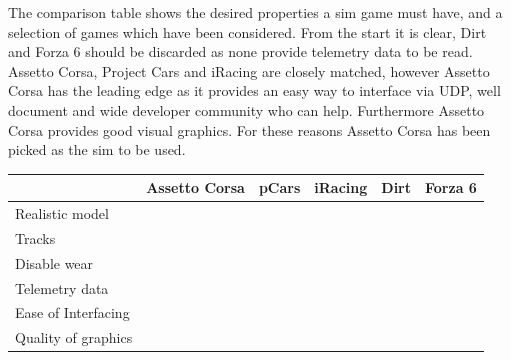The comparison table shows the desired properties a sim game must have, and a selection of games which have been considered. From the start it is clear, Dirt and Forza 6 should be discarded as none provide telemetry data to be read. Assetto Corsa, Project Cars and iRacing are closely matched, however Assetto Corsa has the leading edge as it provides an easy way to interface via UDP, well document and wide developer community who can help. Furthermore Assetto Corsa provides good visual graphics. For these reasons Assetto Corsa has been picked as the sim to be used.

\begin{center}
	\begin{tabular}{ | l | l | l | l | l | l |}
		\hline
			& Assetto Corsa\cite{assestoCorsa} & pCars \cite{ProjectCars} & iRacing \cite{iRacing} & Dirt \cite{dirtgame} & Forza 6 \cite{forza} \\ \hline
		Realistic model	& \checkmark &\checkmark & \checkmark & \checkmark & \checkmark \\ \hline
		Tracks	& \checkmark &\checkmark & \checkmark &  & \checkmark \\ \hline
		Disable wear & \checkmark & \checkmark & \checkmark & \checkmark & \checkmark \\ \hline
		Telemetry data	& \checkmark & \checkmark & \checkmark &  &  \\ \hline
		Ease of Interfacing	& \checkmark &  & \checkmark &  &  \\ \hline
		Quality of graphics & \checkmark & \checkmark &  & \checkmark & \checkmark \\ \hline
	\end{tabular}
\end{center}

